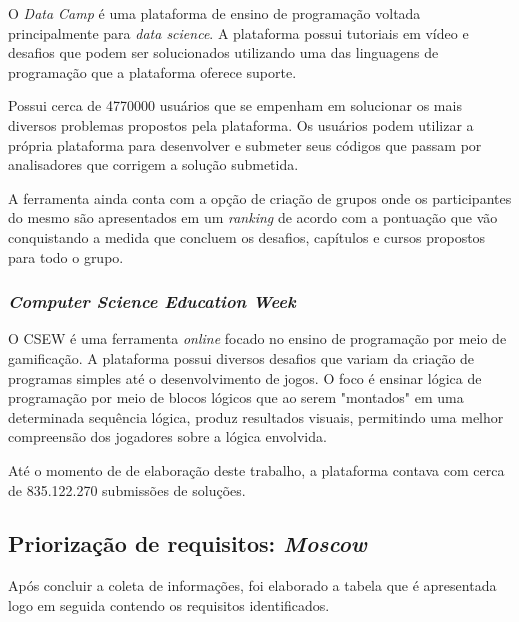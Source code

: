 O \textit{Data Camp} é uma plataforma de ensino de programação voltada principalmente para \textit{data science}.
A plataforma possui tutoriais em vídeo e desafios que podem ser solucionados utilizando uma das linguagens de programação
que a plataforma oferece suporte. \cite{datacamp}

Possui cerca de 4770000 usuários que se empenham em solucionar os mais diversos problemas propostos pela plataforma. Os usuários
podem  utilizar a própria plataforma para desenvolver e submeter seus códigos que passam por analisadores que corrigem a solução submetida.

A ferramenta ainda conta com a opção de criação de grupos onde os participantes do mesmo são apresentados em um \textit{ranking} 
de acordo com a pontuação que vão conquistando a medida que concluem os desafios, capítulos e cursos propostos para todo o grupo.

\subsubsection{\textit{Computer Science Education Week}}
O CSEW é uma ferramenta \textit{online} focado no ensino de programação por meio de gamificação. A plataforma possui
diversos desafios que variam da criação de programas simples até o desenvolvimento de jogos. O foco é ensinar lógica de programação 
por meio de blocos lógicos que ao serem "montados" em uma determinada sequência lógica, produz resultados visuais, permitindo uma melhor
compreensão dos jogadores sobre a lógica envolvida.

Até o momento de de elaboração deste trabalho, a plataforma contava com cerca de 835.122.270 submissões de soluções.

\subsection{Priorização de requisitos: \textit{Moscow}}
Após concluir a coleta de informações, foi elaborado a tabela que é apresentada logo em seguida contendo os requisitos
identificados.

\pagebreak

